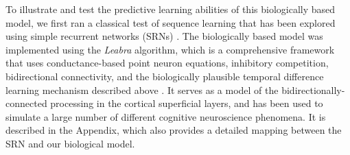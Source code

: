 \documentclass[11pt,twoside]{article}
\newif\myifpdf
\begin{document}



To illustrate and test the predictive learning abilities of this biologically based model, we first ran a classical test of sequence learning \citep{Reber67,CleeremansMcClelland91} that has been explored using simple recurrent networks (SRNs) \citep{Elman90,Jordan89}.  The biologically based model was implemented using the {\em Leabra} algorithm, which is a comprehensive framework that uses conductance-based point neuron equations, inhibitory competition, bidirectional connectivity, and the biologically plausible temporal difference learning mechanism described above \citep{OReillyHazyHerd16,OReillyMunakataFrankEtAl12,OReillyMunakata00,OReilly98,OReilly96}.  It serves as a model of the bidirectionally-connected processing in the cortical superficial layers, and has been used to simulate a large number of different cognitive neuroscience phenomena.  It is described in the Appendix, which also provides a detailed mapping between the SRN and our biological model.
\end{document}
